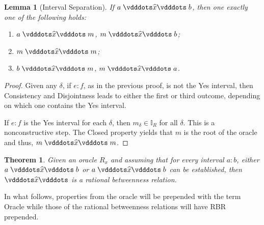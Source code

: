 \documentclass[12pt]{article}
\newtheorem{theorem}{Theorem}[section]
\newtheorem{lemma}{Lemma}[section]
\begin{document}
\begin{lemma}[Interval Separation]\label{os:intsep}
  If $a \xora b$, then one exactly one of the following holds: 
  \begin{enumerate}
        \item $a\xora m$, \sout{$m \xora b$};
        \item $m \xora m$; 
        \item $b \xora m$, \sout{$m \xora a$}.
    \end{enumerate}
\end{lemma}

\begin{proof}
Given any $\delta$, if $e:f$, as in the previous proof, is not the Yes interval, then Consistency and Disjointness leads to either the first or third outcome, depending on which one contains the Yes interval. 

If $e:f$ is the Yes interval for each $\delta$, then $m_\delta \in \mathbb{I}_R$ for all $\delta$. This is a nonconstructive step. The Closed property yields that $m$ is the root of the oracle and thus, $m \xora m$.
\end{proof}


\begin{theorem}
    Given an oracle $R_x$ and assuming that for every interval $a:b$, either $a \xora b$ or \sout{$a \xora b$} can be established, then $\xora$ is a rational betweenness relation. 
\end{theorem}


In what follows, properties from the oracle will be prepended with the term Oracle while those of the rational betweenness relations will have RBR prepended. 
\end{document}
